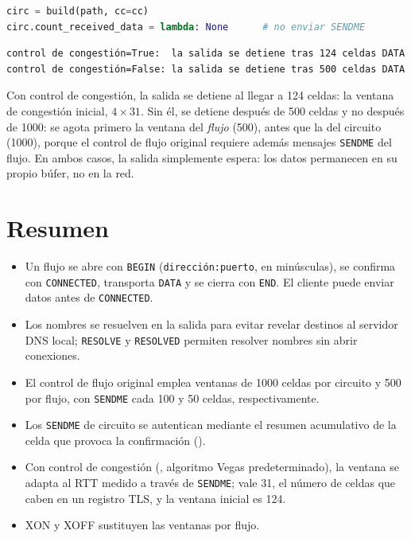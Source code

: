 \begin{lstlisting}[language=Python]
circ = build(path, cc=cc)
circ.count_received_data = lambda: None      # no enviar SENDME
\end{lstlisting}

\begin{lstlisting}[numbers=none]
control de congestión=True:  la salida se detiene tras 124 celdas DATA
control de congestión=False: la salida se detiene tras 500 celdas DATA
\end{lstlisting}

Con control de congestión, la salida se detiene al llegar a 124 celdas: la ventana de congestión inicial, $4 \times 31$. Sin él, se detiene después de 500 celdas y no después de 1000: se agota primero la ventana del \emph{flujo} (500), antes que la del circuito (1000), porque el control de flujo original requiere además mensajes \texttt{SENDME} del flujo. En ambos casos, la salida simplemente espera: los datos permanecen en su propio búfer, no en la red.

\section*{Resumen}
\begin{itemize}
  \item Un flujo se abre con \texttt{BEGIN} (\texttt{dirección:puerto}, en minúsculas), se confirma con \texttt{CONNECTED}, transporta \texttt{DATA} y se cierra con \texttt{END}. El cliente puede enviar datos antes de \texttt{CONNECTED}.
  \item Los nombres se resuelven en la salida para evitar revelar destinos al servidor DNS local; \texttt{RESOLVE} y \texttt{RESOLVED} permiten resolver nombres sin abrir conexiones.
  \item El control de flujo original emplea ventanas de 1000 celdas por circuito y 500 por flujo, con \texttt{SENDME} cada 100 y 50 celdas, respectivamente.
  \item Los \texttt{SENDME} de circuito se autentican mediante el resumen acumulativo de la celda que provoca la confirmación ().
  \item Con control de congestión (, algoritmo Vegas predeterminado), la ventana se adapta al RTT medido a través de \texttt{SENDME};  vale 31, el número de celdas que caben en un registro TLS, y la ventana inicial es 124.
  \item XON y XOFF sustituyen las ventanas por flujo.
\end{itemize}

